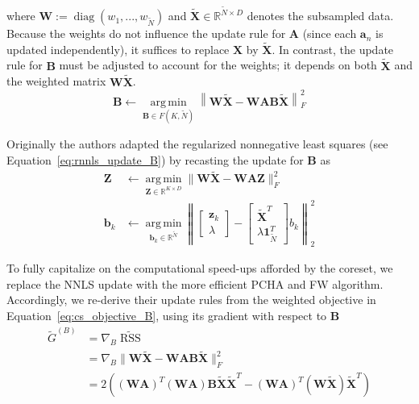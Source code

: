 \documentclass{article}
\DeclareMathOperator*{\argmin}{arg\,min}
\begin{document}
where $\mathbf{W} := \operatorname{diag}(w_1, ..., w_{\tilde{N}})$ and $\tilde{\mathbf{X}} \in \mathbb{R}^{\tilde{N} \times D}$ denotes the subsampled data. Because the weights do not influence the update rule for $\mathbf{A}$ (since each $\mathbf{a}_n$ is updated independently), it suffices to replace $\mathbf{X}$ by $\tilde{\mathbf{X}}$. In contrast, the update rule for $\mathbf{B}$ must be adjusted to account for the weights; it depends on both $\tilde{\mathbf{X}}$ and the weighted matrix $\mathbf{W}\tilde{\mathbf{X}}$.\begin{equation}
    \label{eq:cs_objective_B}
    \mathbf{B} \gets \operatorname*{arg\,min}_{\mathbf{B} \in F(K, \tilde{N})} \left\| \mathbf{W} \tilde{\mathbf{X}} - \mathbf{W} \mathbf{A} \mathbf{B} \tilde{\mathbf{X}} \right\|_F^2
\end{equation}

Originally the authors adapted the regularized nonnegative least squares (see Equation~\ref{eq:rnnls_update_B}) by recasting the update for $\mathbf{B}$ as
\begin{equation}
    \begin{aligned}
        \mathbf{Z} &\gets \underset{\mathbf{Z} \in \mathbb{R}^{K \times D}}{\argmin} \| \mathbf{W} \tilde{\mathbf{X}} - \mathbf{W} \mathbf{A} \mathbf{Z}\|_F^2 \\
        \mathbf{b}_k &\gets \underset{\mathbf{b}_k \in \mathbb{R}^{\tilde{N}}}{\argmin} \left\| \begin{bmatrix} \mathbf{z}_k \\ \lambda \end{bmatrix} - \begin{bmatrix} \tilde{\mathbf{X}}^T \\ \lambda \mathbf{1}_{\tilde{N}}^T \end{bmatrix} b_k \right\|_2^2
    \end{aligned}
\end{equation}

To fully capitalize on the computational speed-ups afforded by the coreset, we replace the NNLS update with the more efficient PCHA and FW algorithm.  Accordingly, we re-derive their update rules from the weighted objective in Equation~\ref{eq:cs_objective_B}, using its gradient with respect to $\mathbf{B}$
\begin{equation}
    \label{eq:cs_grad_B}
    \begin{aligned}
        \tilde{G}^{(B)}
        &= \nabla_B \widetilde{\operatorname{RSS}} \\
        &= \nabla_B \| \mathbf{W} \tilde{\mathbf{X}} - \mathbf{W} \mathbf{A} \mathbf{B} \tilde{\mathbf{X}} \|_F^2 \\
        & = 2 \left( \left(\mathbf{W} \mathbf{A} \right)^T  \left(\mathbf{W} \mathbf{A} \right) \mathbf{B} \tilde{\mathbf{X}} \tilde{\mathbf{X}}^T - \left(\mathbf{W} \mathbf{A} \right)^T \left( \mathbf{W} \tilde{\mathbf{X}} \right) \tilde{\mathbf{X}}^T \right)
    \end{aligned}
\end{equation}
\end{document}
